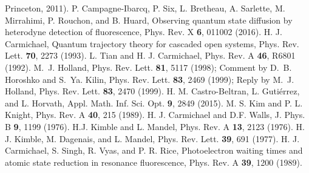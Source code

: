\documentclass[twocolumn,aps,eqsecnum,showkeys,amsmath]{revtex4}
\begin{document}
\begin{references}
Princeton, 2011).
%
 P. Campagne-Ibarcq, P. Six, L. Bretheau, A. Sarlette, 
M. Mirrahimi, P. Rouchon, and B. Huard, Observing quantum state 
diffusion by heterodyne detection of fluorescence, Phys. Rev. X 
\textbf{6}, 011002 (2016).
%
 H. J. Carmichael, Quantum trajectory 
theory for cascaded open systems,  Phys. Rev. Lett. \textbf{70}, 2273 
(1993). 
 L. Tian and H. J. Carmichael, Phys. Rev. A \textbf{46}, 
	R6801 (1992).
%
 M.~J. Holland, Phys. Rev. Lett. \textbf{81}, 5117 
(1998); Comment by D.~B. Horoshko and S.~Ya. Kilin, Phys. Rev. Lett. 
\textbf{83}, 2469 (1999); 
Reply by M.~J. Holland, Phys. Rev. Lett. \textbf{83}, 2470 (1999).
%
 H. M. Castro-Beltran, L. Guti\'errez, and L. Horvath,  
Appl. Math. Inf. Sci. Opt. \textbf{9}, 2849 (2015). 
%
 M. S. Kim and P. L. Knight, Phys. Rev. A 
\textbf{40}, 215 (1989).
%
 H. J.  Carmichael and D.F. Walls, J. Phys. B 
	{\bf 9}, 1199 (1976). 
%
 H.J. Kimble and L. Mandel, Phys. Rev. A 
\textbf{13}, 2123 (1976).
%
 H. J. Kimble, M. Dagenais, and L. Mandel, 
	Phys. Rev. Lett. {\bf 39}, 691 (1977).
%
 H. J. Carmichael, S. Singh, R. Vyas, and P. R. Rice, 
Photoelectron waiting times and atomic state reduction in resonance 
fluorescence, Phys. Rev. A \textbf{39}, 1200 (1989).  

 
\end{references}
\end{document}
